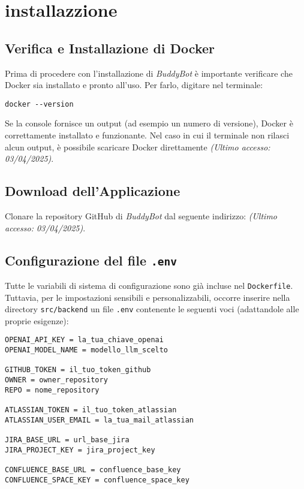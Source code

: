 

\section{installazzione}
\label{sec:installazzione}

\subsection{Verifica e Installazione di Docker}
Prima di procedere con l'installazione di \textit{BuddyBot} è importante verificare che Docker sia installato e pronto all'uso.  
Per farlo, digitare nel terminale:
\begin{verbatim}
docker --version
\end{verbatim}
Se la console fornisce un output (ad esempio un numero di versione), Docker è correttamente installato e funzionante.  
Nel caso in cui il terminale non rilasci alcun output, è possibile scaricare Docker direttamente 
\emph{(Ultimo accesso: 03/04/2025)}.

\subsection{Download dell'Applicazione}
Clonare la repository GitHub di \textit{BuddyBot} dal seguente indirizzo:
\emph{(Ultimo accesso: 03/04/2025)}.\\

\subsection{Configurazione del file \texttt{.env}}
Tutte le variabili di sistema di configurazione sono già incluse nel \texttt{Dockerfile}.  
Tuttavia, per le impostazioni sensibili e personalizzabili, occorre inserire nella directory \texttt{src/backend} un file \texttt{.env} contenente le seguenti voci (adattandole alle proprie esigenze):
\begin{verbatim}
OPENAI_API_KEY = la_tua_chiave_openai
OPENAI_MODEL_NAME = modello_llm_scelto

GITHUB_TOKEN = il_tuo_token_github
OWNER = owner_repository
REPO = nome_repository

ATLASSIAN_TOKEN = il_tuo_token_atlassian
ATLASSIAN_USER_EMAIL = la_tua_mail_atlassian

JIRA_BASE_URL = url_base_jira
JIRA_PROJECT_KEY = jira_project_key

CONFLUENCE_BASE_URL = confluence_base_key
CONFLUENCE_SPACE_KEY = confluence_space_key
\end{verbatim}

